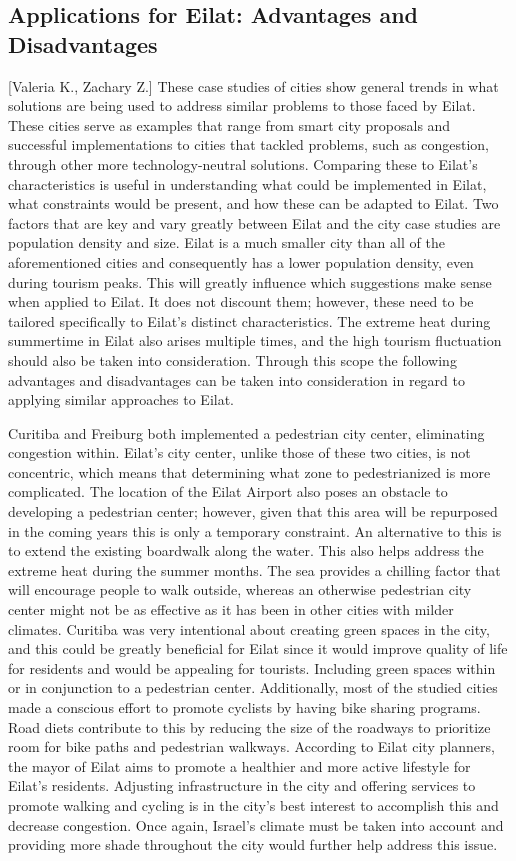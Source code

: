 \documentclass[12pt]{article}                               %
\begin{document}
\subsection{Applications for Eilat: Advantages and Disadvantages}[Valeria K., Zachary Z.]
These case studies of cities show general trends in what solutions are being used to address similar problems to those faced by Eilat. These cities serve as examples that range from smart city proposals and successful implementations to cities that tackled problems, such as congestion, through other more technology-neutral solutions. Comparing these to Eilat's characteristics is useful in understanding what could be implemented in Eilat, what constraints would be present, and how these can be adapted to Eilat. Two factors that are key and vary greatly between Eilat and the city case studies are population density and size. Eilat is a much smaller city than all of the aforementioned cities and consequently has a lower population density, even during tourism peaks. This will greatly influence which suggestions make sense when applied to Eilat. It does not discount them; however, these need to be tailored specifically to Eilat's distinct characteristics. The extreme heat during summertime in Eilat also arises multiple times, and the high tourism fluctuation should also be taken into consideration. Through this scope the following advantages and disadvantages can be taken into consideration in regard to applying similar approaches to Eilat. 

Curitiba and Freiburg both implemented a pedestrian city center, eliminating congestion within. Eilat's city center, unlike those of these two cities, is not concentric, which means that determining what zone to pedestrianized is more complicated. The location of the Eilat Airport also poses an obstacle to developing a pedestrian center; however, given that this area will be repurposed in the coming years this is only a temporary constraint. An alternative to this is to extend the existing boardwalk along the water. This also helps address the extreme heat during the summer months. The sea provides a chilling factor that will encourage people to walk outside, whereas an otherwise pedestrian city center might not be as effective as it has been in other cities with milder climates. Curitiba was very intentional about creating green spaces in the city, and this could be greatly beneficial for Eilat since it would improve quality of life for residents and would be appealing for tourists. Including green spaces within or in conjunction to a pedestrian center. Additionally, most of the studied cities made a conscious effort to promote cyclists by having bike sharing programs. Road diets contribute to this by reducing the size of the roadways to prioritize room for bike paths and pedestrian walkways. According to Eilat city planners, the mayor of Eilat aims to promote a healthier and more active lifestyle for Eilat's residents. Adjusting infrastructure in the city and offering services to promote walking and cycling is in the city's best interest to accomplish this and decrease congestion. Once again, Israel's climate must be taken into account and providing more shade throughout the city would further help address this issue. 
\end{document}

